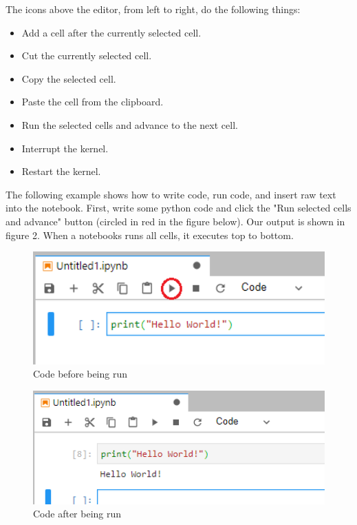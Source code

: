 \documentclass[pdftex,12pt]{artikel3}
\begin{document}
The icons above the editor, from left to right, do the following things: 

\begin{itemize}
    \item Add a cell after the currently selected cell.
    \item Cut the currently selected cell.
    \item Copy the selected cell.
    \item Paste the cell from the clipboard.
    \item Run the selected cells and advance to the next cell.
    \item Interrupt the kernel.
    \item Restart the kernel.
\end{itemize}

The following example shows how to write code, run code, and insert raw text into the notebook. First, write some python code and click the "Run selected cells and advance" button (circled in red in the figure below). Our output is shown in figure 2. When a notebooks runs all cells, it executes top to bottom.

\begin{figure}[h!]
    \centering
    \includegraphics[width=15cm]{code_before_running.png}
    \caption{Code before being run}
    \label{fig:codebeforerunning}
\end{figure}

\begin{figure}[h!]
    \centering
    \includegraphics[width=15cm]{code_after_running.png}
    \caption{Code after being run}
    \label{fig:codeafterrunning}
\end{figure}
\end{document}
